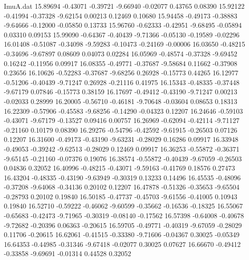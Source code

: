 \begin{filecontents}{ImuA.dat}
  15.89694   -0.43071   -0.39721   -9.66940   -0.02077    0.43765    0.08390
  15.92122   -0.41994   -0.37328   -9.62154    0.00213    0.12469    0.10680
  15.94458   -0.49173   -0.38883   -9.64666   -0.12000   -0.05850    0.13733
  15.96760   -0.62333   -0.42951   -9.68495   -0.05894    0.03310    0.09153
  15.99090   -0.64367   -0.40439   -9.71366   -0.05130   -0.19589   -0.02296
  16.01408   -0.51087   -0.34098   -9.59283   -0.10473   -0.24169   -0.00006
  16.03650   -0.48215   -0.34696   -9.67897    0.08609    0.04073    0.02284
  16.05969   -0.48574   -0.37328   -9.69452    0.16242   -0.11956    0.09917
  16.08355   -0.49771   -0.37687   -9.58684    0.11662   -0.37908    0.23656
  16.10626   -0.52283   -0.37687   -9.68256    0.26928   -0.15773    0.44265
  16.12977   -0.51206   -0.40439   -9.71247    0.26928   -0.21116    0.41975
  16.15343   -0.48335   -0.37448   -9.67179    0.07846   -0.15773    0.38159
  16.17697   -0.49412   -0.43190   -9.71247    0.00213   -0.02033    0.28999
  16.20005   -0.56710   -0.46181   -9.70648   -0.03604    0.08653    0.18313
  16.22309   -0.57906   -0.45583   -9.68256   -0.14290   -0.04323    0.12207
  16.24646   -0.59103   -0.43071   -9.67179   -0.13527    0.09416    0.00757
  16.26969   -0.62094   -0.42114   -9.71127   -0.21160    0.10179    0.08390
  16.29276   -0.54796   -0.42592   -9.61915   -0.26503    0.07126    0.12207
  16.31600   -0.49173   -0.43190   -9.63231   -0.28029    0.16286    0.09917
  16.33948   -0.49053   -0.39242   -9.62513   -0.28029    0.12469    0.09917
  16.36253   -0.55872   -0.36371   -9.65145   -0.21160   -0.07376    0.19076
  16.38574   -0.55872   -0.40439   -9.67059   -0.26503    0.04836    0.32052
  16.40996   -0.48215   -0.43071   -9.59163   -0.41769    0.18576    0.27473
  16.43204   -0.48335   -0.43190   -9.63949   -0.30319    0.13233    0.14496
  16.45535   -0.48096   -0.37208   -9.64068   -0.34136    0.20102    0.12207
  16.47878   -0.51326   -0.35653   -9.65504   -0.28793    0.20102    0.19840
  16.50185   -0.47737   -0.45703   -9.61556   -0.41005    0.10943    0.19840
  16.52710   -0.59222   -0.46062   -9.60599   -0.35662   -0.16536   -0.18325
  16.55067   -0.65683   -0.42473   -9.71965   -0.30319   -0.08140   -0.17562
  16.57398   -0.64008   -0.40678   -9.72682   -0.20396    0.06363   -0.20615
  16.59705   -0.49771   -0.40319   -9.67059   -0.28029    0.11706   -0.20615
  16.62061   -0.41515   -0.33380   -9.71606   -0.04367    0.30025   -0.05349
  16.64353   -0.44985   -0.31346   -9.67418   -0.02077    0.30025    0.07627
  16.66670   -0.49412   -0.33858   -9.69691   -0.01314    0.44528    0.32052

\end{filecontents}

